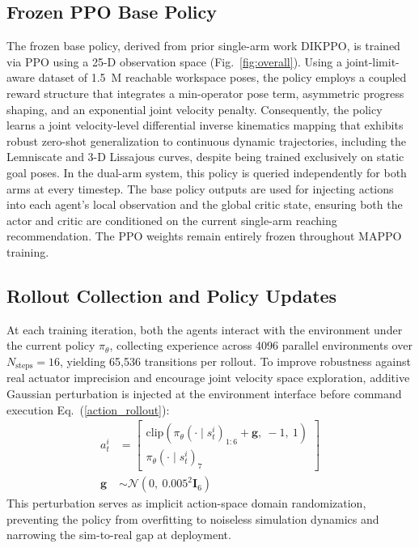 \documentclass[a4paper,fleqn]{cas-dc}
\begin{document}
\subsection{Frozen PPO Base Policy}
\label{base_ppo}
The frozen base policy, derived from prior single-arm work DIKPPO, is trained via PPO \cite{schulman2017proximal} using a 25-D observation space (Fig.~\ref{fig:overall}). Using a joint-limit-aware dataset of 1.5~M reachable workspace poses, the policy employs a coupled reward structure that integrates a min-operator pose term, asymmetric progress shaping, and an exponential joint velocity penalty. Consequently, the policy learns a joint velocity-level differential inverse kinematics mapping that exhibits robust zero-shot generalization to continuous dynamic trajectories, including the Lemniscate and 3-D Lissajous curves, despite being trained exclusively on static goal poses. In the dual-arm system, this policy is queried independently for both arms at every timestep. The base policy outputs are used for injecting actions into each agent's local observation and the global critic state, ensuring both the actor and critic are conditioned on the current single-arm reaching recommendation. The PPO weights remain entirely frozen throughout MAPPO training. 

\subsection{Rollout Collection and Policy Updates}
\label{rollout_collection_policy_updates}
At each training iteration, both the agents interact with the environment under the current policy $\pi_\theta$, collecting experience across 4096 parallel environments over $N_{\text{steps}} = 16$, yielding 65,536 transitions per rollout. To improve robustness against real actuator imprecision and encourage joint velocity space exploration, additive Gaussian perturbation is injected at the environment interface before command execution Eq.~(\ref{action_rollout}):
\begin{equation}
\begin{aligned}
a_t^i &=
\left[
\begin{array}{c}
\mathrm{clip}\left( \pi_{\theta}(\cdot \mid s_t^i)_{1:6} + \mathbf{g},\ -1,\ 1 \right) \\
\pi_{\theta}(\cdot \mid s_t^i)_{7}
\end{array}
\right] \\
\mathbf{g} &\sim \mathcal{N}\left(0,\ 0.005^2 \mathbf{I}_6\right)
\end{aligned}
\label{action_rollout}
\end{equation}
This perturbation serves as implicit action-space domain randomization, preventing the policy from overfitting to noiseless simulation dynamics and narrowing the sim-to-real gap at deployment.
\end{document}
